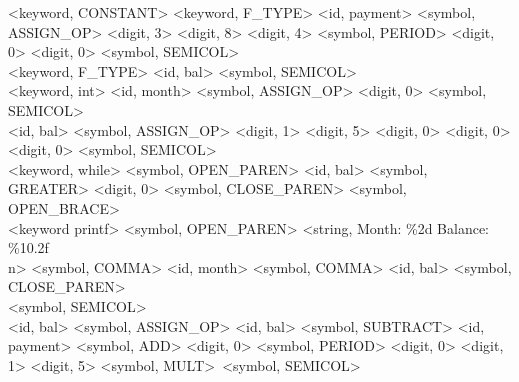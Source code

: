 \documentclass[letterpaper, 10pt]{article}
\begin{document}
\textless keyword, CONSTANT\textgreater
\textless keyword, F\_TYPE\textgreater
\textless id, payment\textgreater
\textless symbol, ASSIGN\_OP\textgreater
\textless digit, 3\textgreater
\textless digit, 8\textgreater
\textless digit, 4\textgreater
\textless symbol, PERIOD\textgreater
\textless digit, 0\textgreater
\textless digit, 0\textgreater
\textless symbol, SEMICOL\textgreater\\

\textless keyword, F\_TYPE\textgreater
\textless id, bal\textgreater
\textless symbol, SEMICOL\textgreater\\

\textless keyword, int\textgreater
\textless id, month\textgreater
\textless symbol, ASSIGN\_OP\textgreater
\textless digit, 0\textgreater
\textless symbol, SEMICOL\textgreater\\

\textless id, bal\textgreater
\textless symbol, ASSIGN\_OP\textgreater
\textless digit, 1\textgreater
\textless digit, 5\textgreater
\textless digit, 0\textgreater
\textless digit, 0\textgreater
\textless digit, 0\textgreater
\textless symbol, SEMICOL\textgreater\\

\textless keyword, while\textgreater
\textless symbol, OPEN\_PAREN\textgreater
\textless id, bal\textgreater
\textless symbol, GREATER\textgreater
\textless digit, 0\textgreater
\textless symbol, CLOSE\_PAREN\textgreater
\textless symbol, OPEN\_BRACE\textgreater\\

\textless keyword printf\textgreater
\textless symbol, OPEN\_PAREN\textgreater
\textless string, Month: \%2d Balance: \%10.2f\\n\textgreater
\textless symbol, COMMA\textgreater
\textless id, month\textgreater
\textless symbol, COMMA\textgreater
\textless id, bal\textgreater
\textless symbol, CLOSE\_PAREN\textgreater\\
\textless symbol, SEMICOL\textgreater\\

\textless id, bal\textgreater
\textless symbol, ASSIGN\_OP\textgreater
\textless id, bal\textgreater
\textless symbol, SUBTRACT\textgreater
\textless id, payment\textgreater
\textless symbol, ADD\textgreater
\textless digit, 0\textgreater
\textless symbol, PERIOD\textgreater
\textless digit, 0\textgreater
\textless digit, 1\textgreater
\textless digit, 5\textgreater
\textless symbol, MULT\textgreater\
\textless symbol, SEMICOL\textgreater\\
\end{document}
